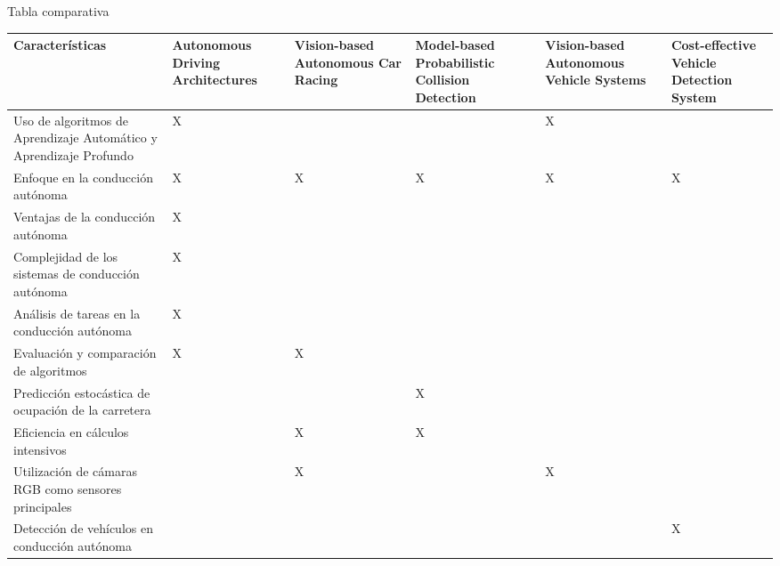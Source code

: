 \documentclass[8pt]{beamer}
\begin{document}
    \begin{frame}{Tabla comparativa}
        \begin{table}
            \footnotesize
            \begin{tabular}{|p{3cm}|p{1.2cm}|p{1.2cm}|p{1.2cm}|p{1.2cm}|p{1.2cm}|}
                \hline
                \textbf{Características}
                & \textbf{Autonomous Driving Architectures}
                & \textbf{Vision-based Autonomous Car Racing}
                & \textbf{Model-based Probabilistic Collision Detection}
                & \textbf{Vision-based Autonomous Vehicle Systems}
                & \textbf{Cost-effective Vehicle Detection System} \\
                \hline
                Uso de algoritmos de Aprendizaje Automático y Aprendizaje Profundo & X &   &   & X &   \\
                \hline
                Enfoque en la conducción autónoma                                  & X & X & X & X & X \\
                \hline
                Ventajas de la conducción autónoma                                 & X &   &   &   &   \\
                \hline
                Complejidad de los sistemas de conducción autónoma                 & X &   &   &   &   \\
                \hline
                Análisis de tareas en la conducción autónoma                       & X &   &   &   &   \\
                \hline
                Evaluación y comparación de algoritmos                             & X & X &   &   &   \\
                \hline
                Predicción estocástica de ocupación de la carretera                &   &   & X &   &   \\
                \hline
                Eficiencia en cálculos intensivos                                  &   & X & X &   &   \\
                \hline
                Utilización de cámaras RGB como sensores principales               &   & X &   & X &   \\
                \hline
                Detección de vehículos en conducción autónoma                      &   &   &   &   & X \\
                \hline
            \end{tabular}
        \end{table}
    \end{frame}
\end{document}
